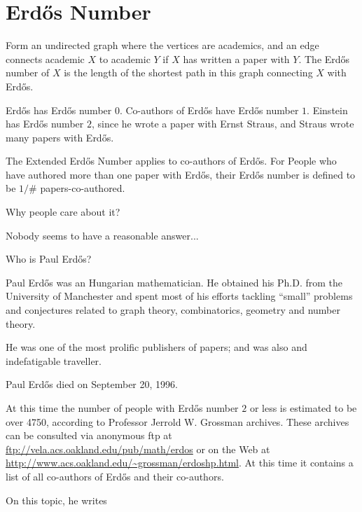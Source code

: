 \section{Erd\H os Number}

    Form an undirected graph where the vertices are academics, and an
    edge connects academic $X$ to academic $Y$ if $X$ has written a paper
    with $Y$. The Erd\H os number of $X$ is the length of the shortest path
    in this graph connecting $X$ with Erd\H os.

    Erd\H os has Erd\H os number $0$.  Co-authors of Erd\H os have Erd\H os number $1$.
    Einstein has Erd\H os number $2$, since he wrote a paper with Ernst Straus,
    and Straus wrote many papers with Erd\H os.


    The Extended Erd\H os Number applies to co-authors of Erd\H os.
    For People who have authored more than one paper with Erd\H os,
    their Erd\H os number is defined to be $1/\#$ papers-co-authored.

    Why people care about it?

     Nobody seems to have a reasonable answer...

    Who is Paul Erd\H os?

    Paul Erd\H os was an Hungarian mathematician. He obtained his Ph.D.
    from the University of Manchester and spent most of his
    efforts tackling ``small'' problems and conjectures related to
    graph theory, combinatorics, geometry and number theory.

    He was one of the most prolific publishers of papers; and was
    also and indefatigable traveller.

    Paul Erd\H os died on September 20, 1996.

    At this time the number of people with Erd\H os number $2$ or less
    is estimated to be over 4750, according to Professor Jerrold
    W. Grossman archives. These archives can be consulted via
    anonymous ftp at \url{ftp://vela.acs.oakland.edu/pub/math/erdos} or
    on the Web at
    \url{http://www.acs.oakland.edu/~grossman/erdoshp.html}.
    At this time it contains a list of all co-authors
    of Erd\H os and their co-authors.

    On this topic, he writes

